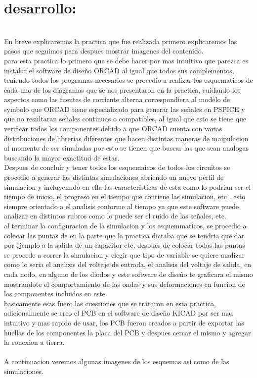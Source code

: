 \documentclass[12pt]{article}
\begin{document}
\section{desarrollo:}
\\En breve explicaremos la practica que fue realizada primero explicaremos los pasos que seguimos para despues mostrar imagenes del contenido.\\
para esta practica lo primero que se debe hacer por mas intuitivo que parezca es instalar el software de diseño ORCAD al igual que todos sus complementos, teniendo todos los programas necesarios se procedio a realizar los esquematicos de cada uno de los diagramas que se nos presentaron en la practica, cuidando los aspectos como las fuentes de corriente alterna correspondiera al modelo de symbolo que ORCAD tiene especializado para  generar las señales en PSPICE y que no resultaran señales continuas o  compatibles, al igual que esto se tiene que verificar todos los componentes debido a que ORCAD cuenta con varias distribuciones de librerias diferentes que hacen distintas maneras de maipulacion al momento de ser simuladas por esto se tienen que buscar las que sean analogas buscando la mayor exactitud de estas.\\
Despues de concluir y tener todos los esquemaicos de todos los circuitos se procedio a generar las distintas simulaciones abriendo un nuevo perfil de simulacion y incluyenndo en ella las caracteristicas de esta como lo podrian ser el tiempo de inicio, el progreso en el tiempo que contiene las simulacion, etc . esto siempre orientado a el analisis conforme al tiempo ya que este software puede analizar en distintos rubros como lo puede ser el ruido de las señales, etc.\\
al terminar la  configuracion de la simulacion y los esquemmaticos, se procedio a colocar las puntas de en la parte que la practica dictaba que se tendria que dar por ejemplo a la salida de un capacitor etc, despues de colocar todas las puntas se procede a correr la simulacion y elegir que tipo de variable se quiere analizar como lo seria el analizis del voltaje de entrada, el analisis del voltaje de salida, en cada nodo, en alguno de los diodos y este software de diseño te graficara el mismo mostrandote el comportamiento de las ondas y sus deformaciones en funcion de los componentes incluidos en este.\\
basicamente esas fuero las cuestiones que se trataron en esta practica, adicionalmente se creo el PCB en el software de diseño  KICAD por ser mas intuitivo y mas rapido de usar, los PCB fueron creados a partir de exportar las huellas de los componentes la placa del PCB y despues cercar el mismo y agregar la conexion a tierra.\\\\
A continuacion veremos algunas imagenes de los esquemas asi como de las simulaciones.\\\\
\end{document}
